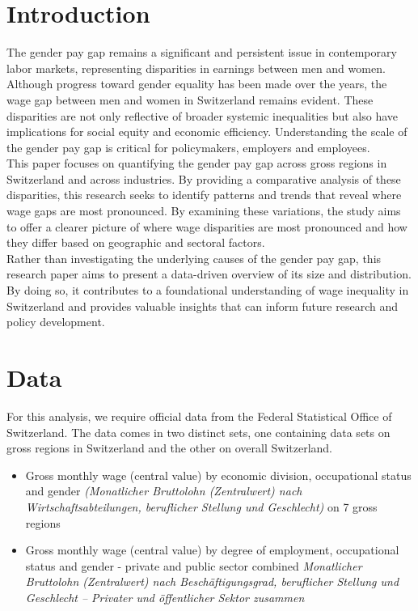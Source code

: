 \documentclass{article}
\begin{document}
\section{Introduction}
The gender pay gap remains a significant and persistent issue in contemporary labor markets, representing disparities in earnings between men and women. Although progress toward gender equality has been made over the years, the wage gap between men and women in Switzerland remains evident. These disparities are not only reflective of broader systemic inequalities but also have implications for social equity and economic efficiency. Understanding the scale of the gender pay gap is critical for policymakers, employers and employees. \\
This paper focuses on quantifying the gender pay gap across gross regions in Switzerland and across industries. By providing a comparative analysis of these disparities, this research seeks to identify patterns and trends that reveal where wage gaps are most pronounced. By examining these variations, the study aims to offer a clearer picture of where wage disparities are most pronounced and how they differ based on geographic and sectoral factors.  \\
Rather than investigating the underlying causes of the gender pay gap, this research paper aims to present a data-driven overview of its size and distribution. By doing so, it contributes to a foundational understanding of wage inequality in Switzerland and provides valuable insights that can inform future research and policy development.


\section{Data}

For this analysis, we require official data from the Federal Statistical Office of Switzerland. The data comes in two distinct sets, one containing data sets on gross regions in Switzerland and the other on overall Switzerland.

    \begin{itemize}
        \item  Gross monthly wage (central value) by economic division, occupational status and gender \textit{(Monatlicher Bruttolohn (Zentralwert) nach Wirtschaftsabteilungen, beruflicher Stellung und Geschlecht)}\cite{1} on 7 gross regions
        \item  Gross monthly wage (central value) by degree of employment, occupational status and gender - private and public sector combined \textit{Monatlicher Bruttolohn (Zentralwert) nach Beschäftigungsgrad, beruflicher Stellung und Geschlecht – Privater und öffentlicher Sektor zusammen} \cite{2}

    \end{itemize}
\end{document}

